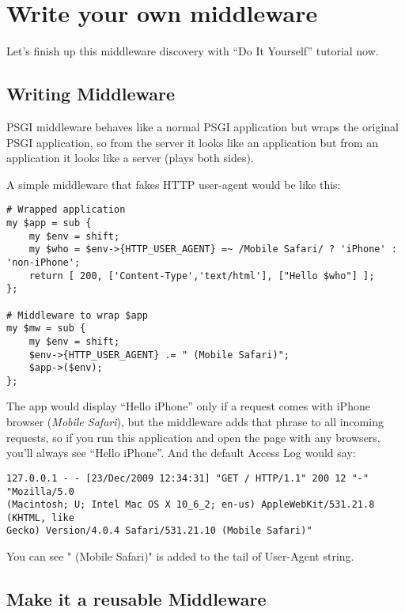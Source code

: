 \chapter{Write your own
middleware}\label{day-23-write-your-own-middleware}

Let's finish up this middleware discovery with ``Do It Yourself''
tutorial now.

\section{Writing Middleware}\label{writing-middleware}

PSGI middleware behaves like a normal PSGI application but wraps the
original PSGI application, so from the server it looks like an
application but from an application it looks like a server (plays both
sides).

A simple middleware that fakes HTTP user-agent would be like this:

\begin{lstlisting}
# Wrapped application
my $app = sub {
    my $env = shift;
    my $who = $env->{HTTP_USER_AGENT} =~ /Mobile Safari/ ? 'iPhone' : 'non-iPhone';
    return [ 200, ['Content-Type','text/html'], ["Hello $who"] ];
};

# Middleware to wrap $app
my $mw = sub {
    my $env = shift;
    $env->{HTTP_USER_AGENT} .= " (Mobile Safari)";
    $app->($env);
};
\end{lstlisting}

The app would display ``Hello iPhone'' only if a request comes with
iPhone browser (\emph{Mobile Safari}), but the middleware adds that
phrase to all incoming requests, so if you run this application and open
the page with any browsers, you'll always see ``Hello iPhone''. And the
default Access Log would say:

\begin{lstlisting}
127.0.0.1 - - [23/Dec/2009 12:34:31] "GET / HTTP/1.1" 200 12 "-" "Mozilla/5.0 
(Macintosh; U; Intel Mac OS X 10_6_2; en-us) AppleWebKit/531.21.8 (KHTML, like
Gecko) Version/4.0.4 Safari/531.21.10 (Mobile Safari)"
\end{lstlisting}

You can see " (Mobile Safari)" is added to the tail of User-Agent
string.

\section{Make it a reusable
Middleware}\label{make-it-a-reusable-middleware}


